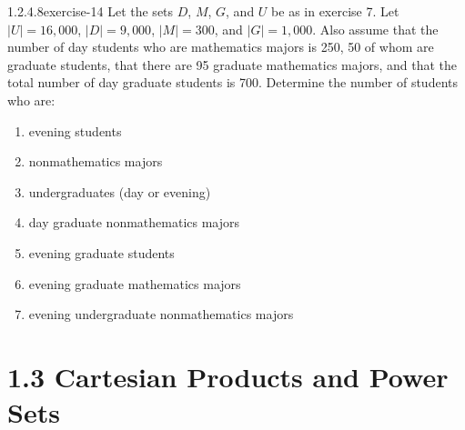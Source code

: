 \documentclass[twoside,10pt,]{book}
\numberwithin{equation}{section}
\begin{document}
\begin{divisionsolution}{1.2.4.8}{}{exercise-14}%
\hypertarget{p-331}{}%
Let the sets \(D\), \(M\), \(G\), and \(U\) be as in exercise 7.  Let \(\lvert U \rvert  = 16,000\), \(\lvert D \rvert = 9,000\), \(|M|=
300\), and \(\lvert G \rvert = 1,000\). Also assume that the number of day students who are mathematics majors is 250, 50 of whom are graduate students, that there are 95 graduate mathematics majors, and that the total number of day graduate students is 700. Determine the number of students who are:\leavevmode%
\begin{multicols}{2}
\begin{enumerate}[label=(\alph*)]
\item\hypertarget{li-259}{}\hypertarget{p-332}{}%
evening students%
\item\hypertarget{li-260}{}\hypertarget{p-333}{}%
nonmathematics majors%
\item\hypertarget{li-261}{}\hypertarget{p-334}{}%
undergraduates (day or evening)%
\item\hypertarget{li-262}{}\hypertarget{p-335}{}%
day graduate nonmathematics majors%
\item\hypertarget{li-263}{}\hypertarget{p-336}{}%
evening graduate students%
\item\hypertarget{li-264}{}\hypertarget{p-337}{}%
evening graduate mathematics majors%
\item\hypertarget{li-265}{}\hypertarget{p-338}{}%
evening undergraduate nonmathematics majors%
\end{enumerate}
\end{multicols}
%
\end{divisionsolution}%
\section*{1.3 Cartesian Products and Power Sets}
\end{document}
